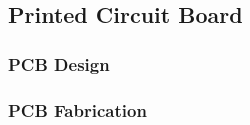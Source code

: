 \subsection{Printed Circuit Board}
        \subsubsection{PCB Design}
        \subsubsection{PCB Fabrication}